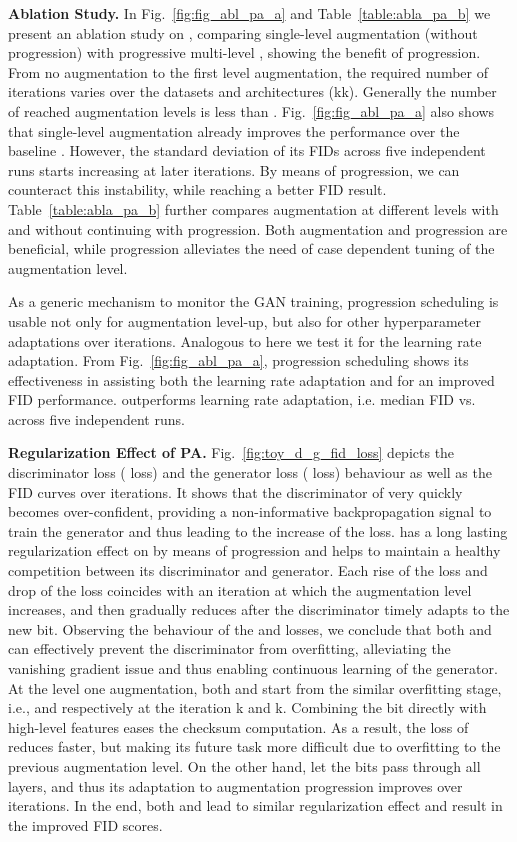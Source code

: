 \documentclass{article}
\begin{document}
\textbf{Ablation Study.}
In Fig.~\ref{fig:fig_abl_pa_a} and Table~\ref{table:abla_pa_b} we present an ablation study on , comparing single-level augmentation (without progression) with progressive multi-level , showing the benefit of progression. From no augmentation to the first level augmentation, the required number of iterations varies over the datasets and architectures (\unit{k}\unit{k}). Generally the number of reached augmentation levels is less than . Fig.~\ref{fig:fig_abl_pa_a} also shows that single-level augmentation already improves the performance over the baseline . However, the standard deviation of its FIDs across five independent runs starts increasing at later iterations. By means of progression, we can counteract this instability, while reaching a better FID result. Table~\ref{table:abla_pa_b} further compares augmentation at different levels with and without continuing with progression. Both augmentation and progression are beneficial, while progression alleviates the need of case dependent tuning of the augmentation level.

As a generic mechanism to monitor the GAN training, progression scheduling is usable not only for augmentation level-up, but also for other hyperparameter adaptations over iterations. Analogous to \cite{Binkowski2016MMDGAN} here we test it for the learning rate adaptation. From Fig.~\ref{fig:fig_abl_pa_a}, progression scheduling shows its effectiveness in assisting both the learning rate adaptation and  for an improved FID performance.  outperforms learning rate adaptation, i.e. median FID  vs.  across five independent runs. 


\textbf{Regularization Effect of PA.}\label{sec_toy_example}
Fig.~\ref{fig:toy_d_g_fid_loss} depicts the discriminator loss ( loss) and the generator loss ( loss) behaviour as well as the FID curves over iterations. It shows that the discriminator of  very quickly becomes over-confident, providing a non-informative backpropagation signal to train the generator and thus leading to the increase of the  loss.  has a long lasting regularization effect on  by means of progression and helps to maintain a healthy competition between its discriminator and generator. 
Each rise of the  loss and drop of the  loss coincides with an iteration at which the augmentation level increases, and then gradually reduces after the discriminator timely adapts to the new bit.
Observing the behaviour of the  and  losses, we conclude that both  and  can effectively prevent the  discriminator from overfitting, alleviating
the vanishing gradient issue and thus enabling continuous learning of the generator.
At the level one augmentation, both  and  start from the similar overfitting stage, i.e.,  and  respectively at the iteration \unit{k} and \unit{k}. Combining the bit  directly with high-level features eases the checksum computation. As a result, the  loss of  reduces faster, but making its future task more difficult due to overfitting to the previous augmentation level. On the other hand,  let the bits pass through all layers, and thus its adaptation to augmentation progression improves over iterations. In the end, both  and  lead to similar regularization effect and result in the improved FID scores.
\end{document}
